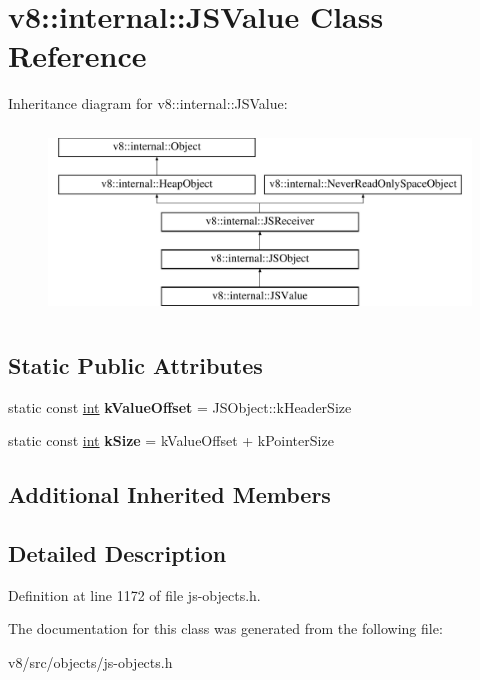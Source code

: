 \hypertarget{classv8_1_1internal_1_1JSValue}{}\section{v8\+:\+:internal\+:\+:J\+S\+Value Class Reference}
\label{classv8_1_1internal_1_1JSValue}
Inheritance diagram for v8\+:\+:internal\+:\+:J\+S\+Value\+:\begin{figure}[H]
\begin{center}
\leavevmode
\includegraphics[height=5.000000cm]{classv8_1_1internal_1_1JSValue}
\end{center}
\end{figure}
\subsection*{Static Public Attributes}
\begin{DoxyCompactItemize}
\item 
\mbox{\label{classv8_1_1internal_1_1JSValue_a2d01c7fffbb992f02238702dff7d5b8f}} 
static const \mbox{\hyperlink{classint}{int}} {\bfseries k\+Value\+Offset} = J\+S\+Object\+::k\+Header\+Size
\item 
\mbox{\label{classv8_1_1internal_1_1JSValue_a8f0fedf075454bcd7cb54bd598ffde91}} 
static const \mbox{\hyperlink{classint}{int}} {\bfseries k\+Size} = k\+Value\+Offset + k\+Pointer\+Size
\end{DoxyCompactItemize}
\subsection*{Additional Inherited Members}


\subsection{Detailed Description}


Definition at line 1172 of file js-\/objects.\+h.



The documentation for this class was generated from the following file\+:\begin{DoxyCompactItemize}
\item 
v8/src/objects/js-\/objects.\+h\end{DoxyCompactItemize}
